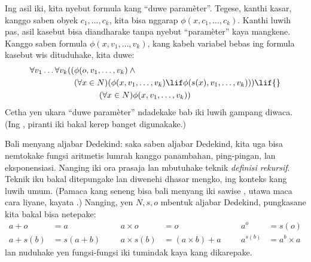 \documentclass[../../../include/open-logic-section]{subfiles}
\begin{document}
Ing asil iki, kita nyebut formula kang ``duwe paramèter''. Tegese,
kanthi kasar, kanggo saben obyek $c_1, \ldots, c_k$, kita bisa nggarap
$\phi(x, c_1, \ldots, c_k)$. Kanthi luwih pas, asil kasebut bisa
diandharake tanpa nyebut ``paramèter'' kaya mangkene. Kanggo saben
formula $\phi(x, v_1, \ldots, v_k)$, kang kabeh variabel bebas ing
formula kasebut wis dituduhake, kita duwe:
	\begin{align*}
			\forall v_1 \ldots \forall v_k((&\phi(o, v_1,\ldots, v_k) \land {}\\
			&	(\forall x \in N)(\phi(x,v_1, \ldots, v_k) \lif \phi(s(x), v_1,\ldots, v_k))) \lif {}\\
			&\hspace{3em} (\forall x \in N)\phi(x, v_1,\ldots, v_k))
	\end{align*}
Cetha yen ukara ``duwe paramèter'' ndadekake bab iki luwih gampang
diwaca. (Ing , piranti iki bakal kerep banget
digunakake.)

Bali menyang aljabar Dedekind: saka saben aljabar Dedekind, kita uga
bisa nemtokake fungsi aritmetis lumrah kanggo panambahan,
ping-pingan, lan eksponensiasi. Nanging iki ora prasaja lan mbutuhake
teknik \emph{definisi rekursif}. Teknik iku bakal ditepungake lan
diwenehi dhasar mengko, ing konteks kang luwih umum. (Pamaca kang
seneng bisa bali menyang iki sawise ,
utawa maca cara liyane, kayata \citealt[kaca~95--8]{Potter2004}.) Nanging,
yen $N, s, o$ mbentuk aljabar Dedekind, pungkasane kita bakal bisa
netepake:
\begin{align*}
	{a} + {o} &= {a} & & & {a} \times {o} &= {o} & & & {a}^{o} &= s(o)\\
{a} + {s}({b}) &= {s}({a}+{b}) &&& {a} \times {s}({b}) &= ({a}\times {b}) + {a}  & & & {a}^{{s}({b})} &= {a}^{b} \times {a}
\end{align*}
lan nuduhake yen fungsi-fungsi iki tumindak kaya kang dikarepake.
\end{document}
